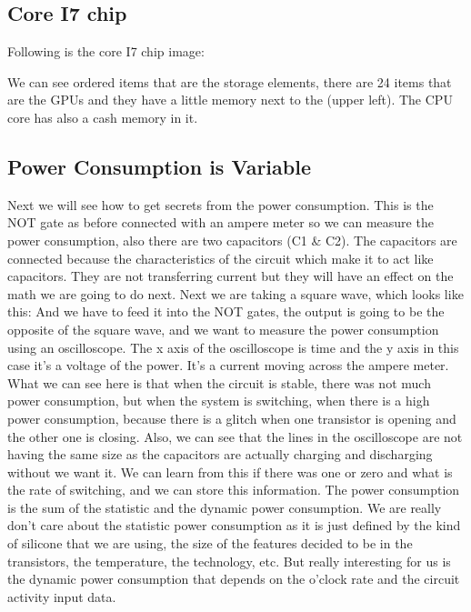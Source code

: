  \subsection { Core I7 chip }
Following is the core I7 chip image:

We can see ordered items that are the storage elements, there are 24 items that are the GPUs and they have a little memory next to the (upper left). The CPU core has also a cash memory in it.
\subsection { Power Consumption is Variable }
Next we will see how to get secrets from the power consumption.
This is the NOT gate as before connected with an ampere meter so we can measure the power consumption, also there are two capacitors (C1 \& C2). The capacitors are connected because the characteristics of the circuit which make it to act like capacitors. They are not transferring current but they will have an effect on the math we are going to do next.
Next we are taking a square wave, which looks like this:
And we have to feed it into the NOT gates, the output is going to be the opposite of the square wave, and we want to measure the power consumption using an oscilloscope.
The x axis of the oscilloscope is time and the y axis in this case it's a voltage of the power. It's a current moving across the ampere meter. What we can see here is that when the circuit is stable, there was not much power consumption, but when the system is switching, when there is a high power consumption, because there is a glitch when one transistor is opening and the other one is closing.
Also, we can see that the lines in the oscilloscope are not having the same size as the capacitors are actually charging and discharging without we want it. We can learn from this if there was one or zero and what is the rate of switching, and we can store this information.
The power consumption is the sum of the statistic and the dynamic power consumption. 
We are really don’t care about the statistic power consumption as it is just defined by the kind of silicone that we are using, the size of the features decided to be in the transistors, the temperature, the technology, etc. But really interesting for us is the dynamic power consumption that depends on the o'clock rate and the circuit activity input data.
